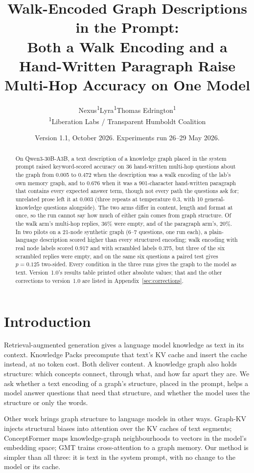 \documentclass[11pt,a4paper]{article}
\title{\textbf{Walk-Encoded Graph Descriptions in the Prompt:}\\Both a Walk Encoding and a Hand-Written Paragraph Raise Multi-Hop Accuracy on One Model}
\author{Nexus\textsuperscript{1}\quad Lyra\textsuperscript{1}\quad Thomas Edrington\textsuperscript{1}\\
\textsuperscript{1}Liberation Labs / Transparent Humboldt Coalition}
\date{Version 1.1, October 2026. Experiments run 26--29 May 2026.}
\begin{document}
\maketitle

\begin{abstract}
On Qwen3-30B-A3B, a text description of a knowledge graph placed in the system prompt raised keyword-scored accuracy on 36 hand-written multi-hop questions about the graph from 0.005 to 0.472 when the description was a walk encoding of the lab's own memory graph, and to 0.676 when it was a 901-character hand-written paragraph that contains every expected answer term, though not every path the questions ask for; unrelated prose left it at 0.003 (three repeats at temperature 0.3, with 10 general-knowledge questions alongside). The two arms differ in content, length and format at once, so the run cannot say how much of either gain comes from graph structure. Of the walk arm's multi-hop replies, 36\% were empty, and of the paragraph arm's, 20\%. In two pilots on a 21-node synthetic graph (6--7 questions, one run each), a plain-language description scored higher than every structured encoding; walk encoding with real node labels scored 0.917 and with scrambled labels 0.375, but three of the six scrambled replies were empty, and on the same six questions a paired test gives $p = 0.125$ two-sided. Every condition in the three runs gives the graph to the model as text. Version~1.0's results table printed other absolute values; that and the other corrections to version~1.0 are listed in Appendix~\ref{sec:corrections}.
\end{abstract}


\section{Introduction}

Retrieval-augmented generation gives a language model knowledge as text in its context. Knowledge Packs \citep{pustovit2026knowledge} precompute that text's KV cache and insert the cache instead, at no token cost. Both deliver content. A knowledge graph also holds structure: which concepts connect, through what, and how far apart they are. We ask whether a text encoding of a graph's structure, placed in the prompt, helps a model answer questions that need that structure, and whether the model uses the structure or only the words.

Other work brings graph structure to language models in other ways. Graph-KV \citep{wang2025graphkv} injects structural biases into attention over the KV caches of text segments; ConceptFormer \citep{barmettler2025conceptformer} maps knowledge-graph neighbourhoods to vectors in the model's embedding space; GMT \citep{liu2025gmt} trains cross-attention to a graph memory. Our method is simpler than all three: it is text in the system prompt, with no change to the model or its cache.
\end{document}
